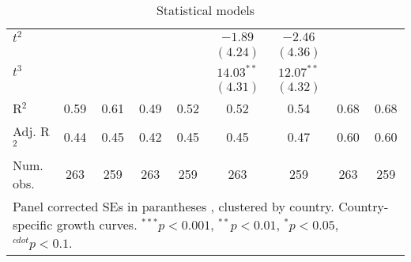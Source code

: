\begin{table}
\begin{center}
\begin{tabular}{l c c c c c c c c }
$t^2$                          &              &               &                &                & $-1.89$        & $-2.46$        &                 &                 \\
                               &              &               &                &                & $(4.24)$       & $(4.36)$       &                 &                 \\
$t^3$                          &              &               &                &                & $14.03^{**}$   & $12.07^{**}$   &                 &                 \\
                               &              &               &                &                & $(4.31)$       & $(4.32)$       &                 &                 \\
\midrule
R$^2$                          & 0.59         & 0.61          & 0.49           & 0.52           & 0.52           & 0.54           & 0.68            & 0.68            \\
Adj. R$^2$                     & 0.44         & 0.45          & 0.42           & 0.45           & 0.45           & 0.47           & 0.60            & 0.60            \\
Num. obs.                      & 263          & 259           & 263            & 259            & 263            & 259            & 263             & 259             \\
\bottomrule
\multicolumn{9}{l}{\scriptsize{Panel corrected SEs in parantheses \cite{Beck.1995}, clustered by country. Country-specific growth curves. $^{***}p<0.001$, $^{**}p<0.01$, $^*p<0.05$, $^{cdot}p<0.1$.}}
\end{tabular}
\caption{Statistical models}
\label{table:coefficients}
\end{center}
\end{table}
